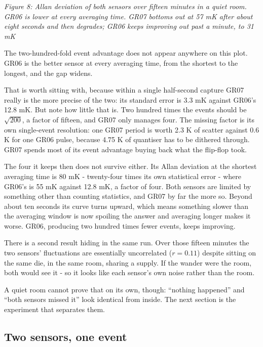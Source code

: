 {
\centering
{}
}

\emph{Figure 8: Allan deviation of both sensors over fifteen minutes in
a quiet room. GR06 is lower at every averaging time. GR07 bottoms out at
57 mK after about eight seconds and then degrades; GR06 keeps improving
out past a minute, to 31 mK}

The two-hundred-fold event advantage does not appear anywhere on this
plot. GR06 is the better sensor at every averaging time, from the
shortest to the longest, and the gap widens.

That is worth sitting with, because within a single half-second capture
GR07 really is the more precise of the two: its standard error is 3.3 mK
against GR06's 12.8 mK. But note how little that is. Two hundred times
the events should be \(\sqrt{200}\), a factor of fifteen, and GR07 only
manages four. The missing factor is its own single-event resolution: one
GR07 period is worth 2.3 K of scatter against 0.6 K for one GR06 pulse,
because 4.75 K of quantiser has to be dithered through. GR07 spends most
of its event advantage buying back what the flip-flop took.

The four it keeps then does not survive either. Its Allan deviation at
the shortest averaging time is 80 mK - twenty-four times its own
statistical error - where GR06's is 55 mK against 12.8 mK, a factor of
four. Both sensors are limited by something other than counting
statistics, and GR07 by far the more so. Beyond about ten seconds its
curve turns upward, which means something slower than the averaging
window is now spoiling the answer and averaging longer makes it worse.
GR06, producing two hundred times fewer events, keeps improving.

There is a second result hiding in the same run. Over those fifteen
minutes the two sensors' fluctuations are essentially uncorrelated
(\(r = 0.11\)) despite sitting on the same die, in the same room,
sharing a supply. If the wander were the room, both would see it - so it
looks like each sensor's own noise rather than the room.

A quiet room cannot prove that on its own, though: ``nothing happened''
and ``both sensors missed it'' look identical from inside. The next
section is the experiment that separates them.

\subsection{Two sensors, one event}\label{two-sensors-one-event}

